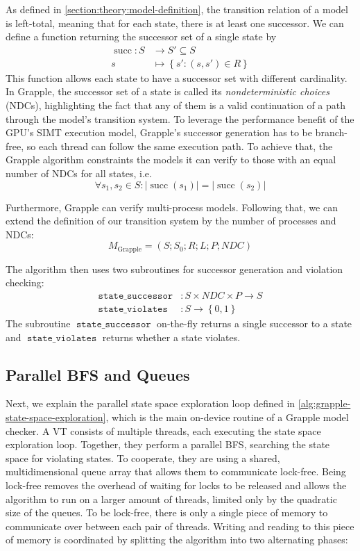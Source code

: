 \documentclass[
fancyheadings, %
%
%
]{stsreprt}
\DeclareMathOperator{\sSuccessor}{\texttt{state\_successor}}
\DeclareMathOperator{\sViolates}{\texttt{state\_violates}}
\begin{document}
As defined in \cref{section:theory:model-definition}, the transition relation of a model is left-total, meaning that for each state, there is at least one successor.
We can define a function returning the successor set of a single state by
\begin{align*}
    \operatorname{succ} : S & \to S' \subseteq S                          \\
    s                       & \mapsto \left\{ s' : (s, s') \in R \right\}
\end{align*}
This function allows each state to have a successor set with different cardinality.
In Grapple, the successor set of a state is called its \emph{nondeterministic choices} (NDCs), highlighting the fact that any of them is a valid continuation of a path through the model's transition system.
To leverage the performance benefit of the GPU's SIMT execution model, Grapple's successor generation has to be branch-free, so each thread can follow the same execution path.
To achieve that, the Grapple algorithm constraints the models it can verify to those with an equal number of NDCs for all states, i.e.\[ \forall s_1, s_2 \in S : |\operatorname{succ}(s_1)| = |\operatorname{succ}(s_2)| \]

Furthermore, Grapple can verify multi-process models.
Following that, we can extend the definition of our transition system by the number of processes and NDCs: \[M_{\text{Grapple}} = \left(S; S_0; R; L; P; \mathit{NDC}\right)\]

The algorithm then uses two subroutines for successor generation and violation checking:
\begin{align*}
    \sSuccessor & : S \times \mathit{NDC} \times \mathit{P}  \to S \\
    \sViolates  & : S \to \left\{0, 1\right\}
\end{align*}
The subroutine $\sSuccessor$ on-the-fly returns a single successor to a state and $\sViolates$ returns whether a state violates.

\subsection{Parallel BFS and Queues}
\label{section:theory:queues}

Next, we explain the parallel state space exploration loop defined in \cref{alg:grapple-state-space-exploration}, which is the main on-device routine of a Grapple model checker.
A VT consists of multiple threads, each executing the state space exploration loop.
Together, they perform a parallel BFS, searching the state space for violating states.
To cooperate, they are using a shared, multidimensional queue array that allows them to communicate lock-free.
Being lock-free removes the overhead of waiting for locks to be released and allows the algorithm to run on a larger amount of threads, limited only by the quadratic size of the queues.
To be lock-free, there is only a single piece of memory to communicate over between each pair of threads.
Writing and reading to this piece of memory is coordinated by splitting the algorithm into two alternating phases:
\end{document}
